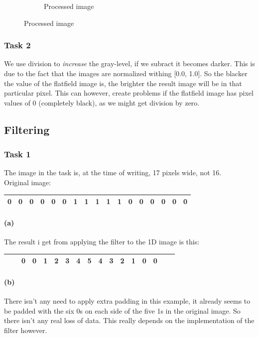 \documentclass{article}
\begin{document}
\begin{figure}[h]
\begin{subfigure}[b]{ 0.45\textwidth}
		\caption{Processed image}
		\label{fig:astro2.png}
	\end{subfigure}
\end{figure}
\subsubsection*{Task 2}
We use division to \emph{increase} the gray-level, if we subract it becomes darker. This is due to the fact that the images are normalized withing [0.0, 1.0]. So the blacker the value of the flatfield image is, the brighter the result image will be in that particular pixel. This can however, create problems if the flatfield image has pixel values of 0 (completely black), as we might get division by zero.


\newpage
\subsection*{Filtering}
\subsubsection*{Task 1}
The image in the task is, at the time of writing, 17 pixels wide, not 16.\\ Original image:
\\
\begin{tabular}{|c|c|c|c|c|c|c|c|c|c|c|c|c|c|c|c|c|}
	\hline
	0 & 0 & 0 & 0 & 0 & 0 & 1 & 1 & 1 & 1 & 1 & 0 & 0 & 0 & 0 & 0 & 0 \\ 
	\hline
\end{tabular}
\paragraph{(a)}
The result i get from applying the filter to the 1D image is this:
\\
\begin{tabular}{|c|c|c|c|c|c|c|l|c|c|c|c|c|c|c|c|c|}
	\hline
	  &   & 0 & 0 & 1 & 2 & 3 & 4 & 5 & 4 & 3 & 2 & 1 & 0 & 0 &   &   \\ 
	\hline
\end{tabular}

\paragraph{(b)}
There isn't any need to apply extra padding in this example, it already seems to be padded with the six 0s on each side of the five 1s in the original image. So there isn't any real loss of data. This really depends on the implementation of the filter however.
\end{document}
